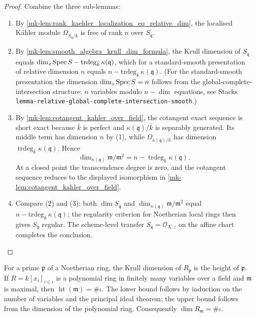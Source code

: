 \begin{proof}
  Combine the three sub-lemmas:
  \begin{enumerate}
    \item By \ref{mk-lem:rank_kaehler_localization_eq_relative_dim},
      the localised K\"ahler module \(\Omega_{S_{\mathfrak q} / \bar k}\)
      is free of rank \(n\) over \(S_{\mathfrak q}\).
    \item By \ref{mk-lem:smooth_algebra_krull_dim_formula}, the Krull dimension of
      \(S_{\mathfrak q}\) equals
      \(\dim_z \operatorname{Spec} S - \mathrm{trdeg}_{\bar k}\,\kappa(\mathfrak q)\),
      which for a standard-smooth presentation of relative dimension
      \(n\) equals \(n - \mathrm{trdeg}_{\bar k}\,\kappa(\mathfrak q)\).
      (For the standard-smooth presentation the dimension
      \(\dim_z \operatorname{Spec} S = n\) follows from the global-complete-intersection
      structure: \(n\) variables modulo \(n - \dim\) equations, see
      Stacks \texttt{lemma-relative-global-complete-intersection-smooth}.)
    \item By \ref{mk-lem:cotangent_kahler_over_field}, the cotangent exact
      sequence is short exact because \(\bar k\) is perfect and
      \(\kappa(\mathfrak q)/\bar k\) is separably generated.  Its middle
      term has dimension \(n\) by (1), while
      \(\Omega_{\kappa(\mathfrak q)/\bar k}\) has dimension
      \(\operatorname{trdeg}_{\bar k}\kappa(\mathfrak q)\).  Hence
      \[
        \dim_{\kappa(\mathfrak q)}\mathfrak m/\mathfrak m^2
        =n-\operatorname{trdeg}_{\bar k}\kappa(\mathfrak q).
      \]
      At a closed point the transcendence degree is zero, and the
      cotangent sequence reduces to the displayed isomorphism in
      \ref{mk-lem:cotangent_kahler_over_field}.
    \item Compare (2) and (3): both \(\dim S_{\mathfrak q}\) and
      \(\dim_{\kappa(\mathfrak q)} \mathfrak m / \mathfrak m^2\) equal
      \(n - \mathrm{trdeg}_{\bar k}\,\kappa(\mathfrak q)\); the
      regularity criterion for Noetherian local rings then gives \(S_{\mathfrak q}\)
      regular. The scheme-level transfer
      \(S_{\mathfrak q} = \mathcal O_{X, z}\) on the affine chart completes
      the conclusion.
  \end{enumerate}
\end{proof}


For a prime \(\mathfrak p\) of a Noetherian ring, the Krull dimension
of \(R_{\mathfrak p}\) is the height of \(\mathfrak p\).  If
\(R=k[x_i]_{i\in\iota}\) is a polynomial ring in finitely many variables
over a field and \(\mathfrak m\) is maximal, then
\(\operatorname{ht}(\mathfrak m)=\#\iota\).  The lower bound follows by
induction on the number of variables and the principal ideal theorem;
the upper bound follows from the dimension of the polynomial ring.
Consequently \(\dim R_{\mathfrak m}=\#\iota\).

